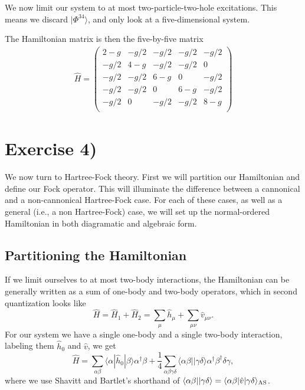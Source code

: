 \documentclass[a4paper, 11pt, notitlepage, english]{article}
\newcommand{\ket}[1]{|#1 \rangle}
\newcommand{\brakket}[2]{\langle #1 || #2 \rangle}
\newcommand{\op}[1]{\hat{#1}}
\newcommand{\braopket}[3]{\langle #1 | {#2} | #3 \rangle}
\begin{document}
We now limit our system to at most two-particle-two-hole excitations. This means we discard $\ket{\Phi^{34}}$, and only look at a five-dimensional system.

The Hamiltonian matrix is then the five-by-five matrix
\begin{align*}
\op{H} = \begin{pmatrix}
2 - g &  -g/2 & -g/2  & -g/2  & -g/2  \\
-g/2  & 4 - g & -g/2  & -g/2  & 0     \\
-g/2  & -g/2  & 6 - g &	0     & -g/2  \\              
-g/2  & -g/2  & 0     & 6 - g &	-g/2  \\                         
-g/2  &	0	  & -g/2  & -g/2  & 8 - g \\
\end{pmatrix}
\end{align*}

\clearpage

\section*{Exercise 4)}

We now turn to Hartree-Fock theory. First we will partition our Hamiltonian and define our Fock operator. This will illuminate the difference between a cannonical and a non-cannonical Hartree-Fock case. For each of these cases, as well as a general (i.e., a non Hartree-Fock) case, we will set up the normal-ordered Hamiltonian in both diagramatic and algebraic form.


\subsection*{Partitioning the Hamiltonian}

If we limit ourselves to at most two-body interactions, the Hamiltonian can be generally written as a sum of one-body and two-body operators, which in second quantization looks like
$$\op{H} = \op{H}_1 + \op{H}_2 = \sum_\mu \op{h}_\mu + \sum_{\mu\nu} \op{v}_{\mu\nu}.$$
For our system we have a single one-body and a single two-body interaction, labeling them $\op{h}_0$ and $\op{v}$, we get
$$\op{H} = \sum_{\alpha\beta} \braopket{\alpha}{\op{h}_0}{\beta}\alpha^\dagger \beta + \frac{1}{4}\sum_{\alpha\beta\gamma\delta}\brakket{\alpha\beta}{\gamma\delta}\alpha^\dagger \beta^\dagger \delta \gamma,$$
where we use Shavitt and Bartlet's shorthand of $\brakket{\alpha\beta}{\gamma\delta} = \braopket{\alpha\beta}{\op{v}}{\gamma\delta}_{\rm AS}$.
\end{document}
